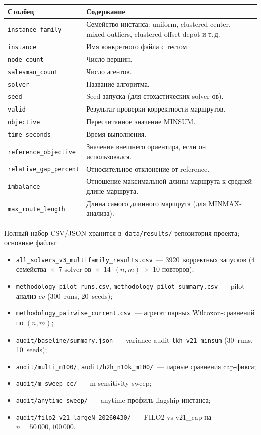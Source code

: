 \documentclass[14pt,a4paper]{extarticle}
\begin{document}
\small
\begin{longtable}{>{\raggedright\arraybackslash}p{}>{\raggedright\arraybackslash}p{}}
\toprule
\textbf{Столбец} & \textbf{Содержание}\\
\midrule
\endhead
\texttt{instance\_family} & Семейство инстанса: uniform, clustered-center, mixed-outliers, clustered-offset-depot и т.\,д.\\
\texttt{instance} & Имя конкретного файла с тестом.\\
\texttt{node\_count} & Число вершин.\\
\texttt{salesman\_count} & Число агентов.\\
\texttt{solver} & Название алгоритма.\\
\texttt{seed} & Seed запуска (для стохастических solver-ов).\\
\texttt{valid} & Результат проверки корректности маршрутов.\\
\texttt{objective} & Пересчитанное значение MINSUM.\\
\texttt{time\_seconds} & Время выполнения.\\
\texttt{reference\_objective} & Значение внешнего ориентира, если он использовался.\\
\texttt{relative\_gap\_percent} & Относительное отклонение от reference.\\
\texttt{imbalance} & Отношение максимальной длины маршрута к средней длине маршрута.\\
\texttt{max\_route\_length} & Длина самого длинного маршрута (для MINMAX-анализа).\\
\bottomrule
\end{longtable}
\normalsize

Полный набор CSV/JSON хранится в~\texttt{data/results/} репозитория проекта; основные файлы:
\begin{itemize}
  \item \texttt{all\_solvers\_v3\_multifamily\_results.csv}~--- 3920~корректных запусков (4 семейства~$\times$~7 solver-ов~$\times$~14~$(n,m)$~$\times$~10 повторов);
  \item \texttt{methodology\_pilot\_runs.csv}, \texttt{methodology\_pilot\_summary.csv}~--- pilot-анализ $cv$ (300~runs, 20~seeds);
  \item \texttt{methodology\_pairwise\_current.csv}~--- агрегат парных Wilcoxon-сравнений по $(n, m)$;
  \item \texttt{audit/baseline/summary.json}~--- variance audit \texttt{lkh\_v21\_minsum} (30~runs, 10~seeds);
  \item \texttt{audit/multi\_m100/}, \texttt{audit/h2h\_n10k\_m100/}~--- парные сравнения cap-фикса;
  \item \texttt{audit/m\_sweep\_cc/}~--- m-sensitivity sweep;
  \item \texttt{audit/anytime\_sweep/}~--- anytime-профиль flagship-инстанса;
  \item \texttt{audit/filo2\_v21\_largeN\_20260430/}~--- FILO2 vs v21\_cap на $n=50\,000, 100\,000$.
\end{itemize}
\end{document}

